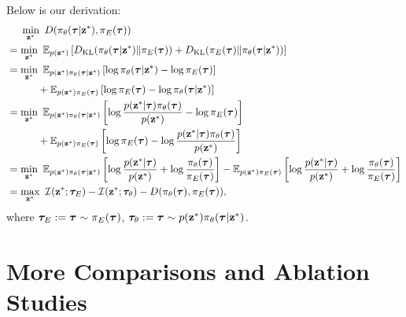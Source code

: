 Below is our derivation: 
\begin{align}
	&\ \ \ \  \min_{\bz^*} \ D(\pi_\theta(\btau|\bz^*), \pi_E(\btau)) \nonumber \\
    &= \min_{\bz^*} \ \mathbb{E}_{p(\bz^*)} \lbr D_\text{KL}(\pi_\theta(\btau|\bz^*)\Vert \pi_E(\btau)) + D_\text{KL}(\pi_E(\btau) \Vert \pi_\theta(\btau|\bz^*)) \rbr 
	\nonumber \\
	&= \min_{\bz^*} \ \mathbb{E}_{p(\bz^*)\pi_\theta(\btau|\bz^*)}\left[\log \pi_\theta(\btau|\bz^*) - \log \pi_E(\btau)\right] \nonumber \\
	&\qquad\quad  + \mathbb{E}_{p(\bz^*)\pi_E(\btau)}\left[\log \pi_E(\btau) - \log \pi_\theta(\btau|\bz^*)\right]
	\nonumber \\
	&= \min_{\bz^*} \ \mathbb{E}_{p(\bz^*)\pi_\theta(\btau|\bz^*)}\left[\log \frac{p(\bz^*|\btau)\pi_\theta(\btau)}{p(\bz^*)} - \log \pi_E(\btau)\right] \nonumber \\
	&\qquad\quad  + \mathbb{E}_{p(\bz^*)\pi_E(\btau)}\left[\log \pi_E(\btau) - \log \frac{p(\bz^*|\btau)\pi_\theta(\btau)}{p(\bz^*)}\right]
	\nonumber \\
	&= \min_{\bz^*} \ \mathbb{E}_{p(\bz^*)\pi_\theta(\btau|\bz^*)}\left[\log \frac{p(\bz^*|\btau)}{p(\bz^*)} + \log \frac{\pi_\theta(\btau)}{\pi_E(\btau)}\right] 
	- \mathbb{E}_{p(\bz^*)\pi_E(\btau)}\left[\log \frac{p(\bz^*|\btau)}{p(\bz^*)}+\log \frac{\pi_\theta(\btau)}{\pi_E(\btau)}\right]
	\nonumber \\
	&= \max_{\bz^*} \ \mathcal{I}(\bz^*; \btau_E) - \mathcal{I}(\bz^*; \btau_\theta) 
	- D(\pi_\theta(\btau), \pi_E(\btau)),
	\nonumber 
\end{align}
where ${\bm{\tau}}_E := {\bm{\tau}} \sim \pi_E({\bm{\tau}})$, ${\bm{\tau}}_\theta := {\bm{\tau}} \sim p({\mathbf{z}}^*)\pi_\theta({\bm{\tau}}|{\mathbf{z}}^*)$. %


\section{More Comparisons and Ablation Studies}


